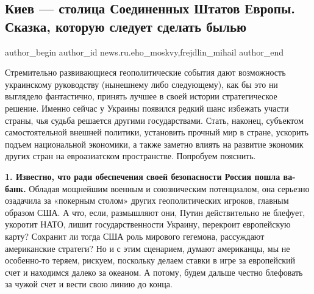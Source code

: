  
 
 
 
 
 
\subsection{Киев — столица Соединенных Штатов Европы. Сказка, которую следует сделать былью}
\label{sec:27_01_2022.stz.news.ru.eho_moskvy.1.kiev_stolica_shtatov_evropy}
 
\ifcmt
 author_begin
   author_id news.ru.eho_moskvy,frejdlin_mihail
 author_end
\fi

\begin{zznagolos}
Стремительно развивающиеся геополитические события дают возможность украинскому
руководству (нынешнему либо следующему), как бы это ни выглядело фантастично,
принять лучшее в своей истории стратегическое решение. Именно сейчас у Украины
появился редкий шанс избежать участи страны, чья судьба решается другими
государствами. Стать, наконец, субъектом самостоятельной внешней политики,
установить прочный мир в стране, ускорить подъем национальной экономики, а
также заметно влиять на развитие экономик других стран на евроазиатском
пространстве. Попробуем пояснить.
\end{zznagolos}

\textbf{1. Известно, что ради обеспечения своей безопасности Россия пошла ва-банк.}
Обладая мощнейшим военным и союзническим потенциалом, она серьезно озадачила за
«покерным столом» других геополитических игроков, главным образом США. А что,
если, размышляют они, Путин действительно не блефует, укоротит НАТО, лишит
государственности Украину, перекроит европейскую карту? Сохранит ли тогда США
роль мирового гегемона, рассуждают американские стратеги? Но и с этим
сценарием, думают американцы, мы не особенно-то теряем, рискуем, поскольку
делаем ставки в игре за европейский счет и находимся далеко за океаном. А
потому, будем дальше честно блефовать за чужой счет и вести свою линию до
конца.

